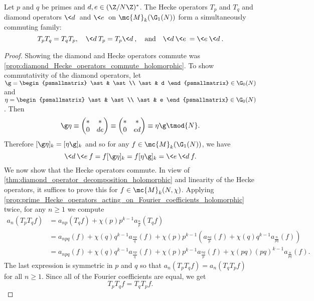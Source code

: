     \begin{proposition}\label{prop:Hecke_operators_commute_holomorphic}
      Let $p$ and $q$ be primes and $d,e \in (\Z/N\Z)^{\ast}$. The Hecke operators $T_{p}$ and $T_{q}$ and diamond operators $\<d\>$ and $\<e\>$ on $\mc{M}_{k}(\G_{1}(N))$ form a simultaneously commuting family:
      \[
        T_{p}T_{q} = T_{q}T_{p}, \quad \<d\>T_{p} = T_{p}\<d\>, \quad \text{and} \quad \<d\>\<e\> = \<e\>\<d\>.
      \]
    \end{proposition}
    \begin{proof}
      Showing the diamond and Hecke operators commute was \cref{prop:diamond_Hecke_operators_commute_holomorphic}. To show commutativity of the diamond operators, let $\g = \begin{psmallmatrix} \ast & \ast \\ \ast & d \end{psmallmatrix} \in \G_{0}(N)$  and $\eta = \begin{psmallmatrix} \ast & \ast \\ \ast & e \end{psmallmatrix} \in \G_{0}(N)$. Then
      \[
        \g\eta \equiv \begin{pmatrix} \ast & \ast \\ 0 & de \end{pmatrix} \equiv \begin{pmatrix} \ast & \ast \\ 0 & ed \end{pmatrix} \equiv \eta\g \tmod{N}.
      \]
      Therefore $[\g\eta]_{k} = [\eta\g]_{k}$ and so for any $f \in \mc{M}_{k}(\G_{1}(N))$, we have
      \[
        \<d\>\<e\>f = f[\g\eta]_{k} = f[\eta\g]_{k} = \<e\>\<d\>f.
      \]
      We now show that the Hecke operators commute. In view of \cref{thm:diamond_operator_decomposition_holomorphic} and linearity of the Hecke operators, it suffices to prove this for $f \in \mc{M}_{k}(N,\chi)$. Applying \cref{prop:prime_Hecke_operators_acting_on_Fourier_coefficients_holomorphic} twice, for any $n \ge 1$ we compute
      \begin{align*}
        a_{n}(T_{p}T_{q}f) &= a_{np}(T_{q}f)+\chi(p)p^{k-1}a_{\frac{n}{p}}(T_{q}f) \\
        &= a_{npq}(f)+\chi(q)q^{k-1}a_{\frac{np}{q}}(f)+\chi(p)p^{k-1}(a_{\frac{nq}{p}}(f)+\chi(q)q^{k-1}a_{\frac{n}{pq}}(f)) \\
        &= a_{npq}(f)+\chi(q)q^{k-1}a_{\frac{np}{q}}(f)+\chi(p)p^{k-1}a_{\frac{nq}{p}}(f)+\chi(pq)(pq)^{k-1}a_{\frac{n}{pq}}(f).
      \end{align*}
      The last expression is symmetric in $p$ and $q$ so that $a_{n}(T_{p}T_{q}f) = a_{n}(T_{q}T_{p}f)$ for all $n \ge 1$. Since all of the Fourier coefficients are equal, we get
      \[
        T_{p}T_{q}f = T_{q}T_{p}f.
      \]
    \end{proof}

